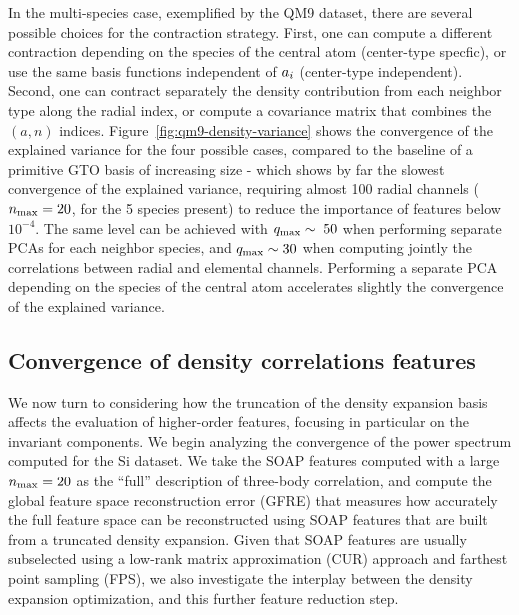 In the multi-species case, exemplified by the QM9 dataset, there are several possible choices for the contraction strategy. First, one can compute a different contraction depending on the species of the central atom (center-type specfic), or use the same basis functions independent of $a_i$ (center-type independent). Second, one can contract separately the density contribution from each neighbor type along the radial index, or compute a covariance matrix that combines the $(a,n)$ indices. 
Figure~\ref{fig:qm9-density-variance} shows the convergence of the explained variance for the four possible cases, compared to the baseline of a primitive GTO basis of increasing size - which shows by far the slowest convergence of the explained variance, requiring almost 100 radial channels ($n_\mathrm{max}=20$, for the 5 species present) to reduce the importance of features below $10^{-4}$.
The same level can be achieved with $q_\mathrm{max}\sim\; 50$ when performing separate PCAs for each neighbor species, and $q_\mathrm{max}\sim 30$ when computing jointly the correlations between radial and elemental channels. 
Performing a separate PCA depending on the species of the central atom accelerates slightly the convergence of the explained variance.

\subsection{Convergence of density correlations features}

We now turn to considering how the truncation of the density expansion basis affects the evaluation of higher-order features, focusing in particular on the invariant components.
We begin analyzing the convergence of the power spectrum computed for the Si dataset. 
We take the SOAP features computed with a large $n_\mathrm{max}=20$ as the ``full'' description of three-body correlation, and compute the global feature space reconstruction error\cite{goscinski2021role} (GFRE) that measures how accurately the full feature space can be reconstructed using SOAP features that are built from a truncated density expansion. Given that SOAP features are usually subselected using a low-rank matrix approximation (CUR) approach\cite{imba+18jcp} and farthest point sampling (FPS)\cite{elda+97ieee,ceri+13jctc}, we also investigate the interplay between the density expansion optimization, and this further feature reduction step.

